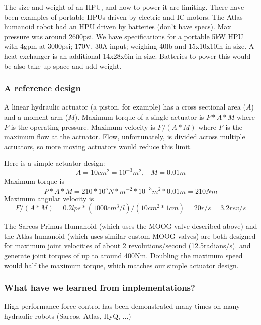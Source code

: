 \documentclass[letterpaper,12pt,fullpage]{article}
\begin{document}
The size and weight of an HPU, and how to power it are limiting.
There have been examples of portable HPUs driven by electric and IC motors.
The Atlas humanoid
robot had an HPU driven by batteries (don't have specs).
Max pressure was around 2600psi.
We have specifications for a portable 
5kW HPU with 4gpm at 3000psi; 170V, 30A input; weighing
40lb and 15x10x10in in size.
A heat exchanger is an additional 14x28x6in in size.
Batteries to power this would be also take up space and 
add weight.

\subsubsection{A reference design}

A linear hydraulic actuator (a piston, for example) has a cross sectional
area ($A$) and a moment arm ($M$). Maximum torque of a single actuator
is $P*A*M$ where $P$ is the operating pressure.
Maximum velocity is $F/(A*M)$ where $F$ is the maximum flow at the
actuator.
Flow, unfortunately, is divided across multiple actuators,
so more moving actuators would reduce this limit.

Here is a simple actuator design:
\begin{equation}
A = 10cm^2 = 10^{-3}m^2, \; \; \; M = 0.01m
\end{equation}
Maximum torque is
\begin{equation}
P*A*M = 210*10^5N*m^{-2}*10^{-3}m^2*0.01m = 210Nm 
\end{equation}
Maximum angular velocity is
\begin{equation}
F/(A*M) = 0.2lps*(1000cm^3/l)/(10cm^2*1cm) = 20r/s = 3.2rev/s
\end{equation}

The Sarcos Primus Humanoid (which uses the MOOG valve described
above) and the Atlas humanoid (which uses similar custom MOOG valves)
are both designed
for maximum joint velocities of about 2 revolutions/second (12.5radians/s).
and generate joint torques of up to around 400Nm.
Doubling the maximum speed would half the maximum torque, which matches
our simple actuator design.

\subsubsection{What have we learned from implementations?}

High performance force control has been demonstrated many times
on many hydraulic robots (Sarcos, Atlas, HyQ, ...)
\end{document}
